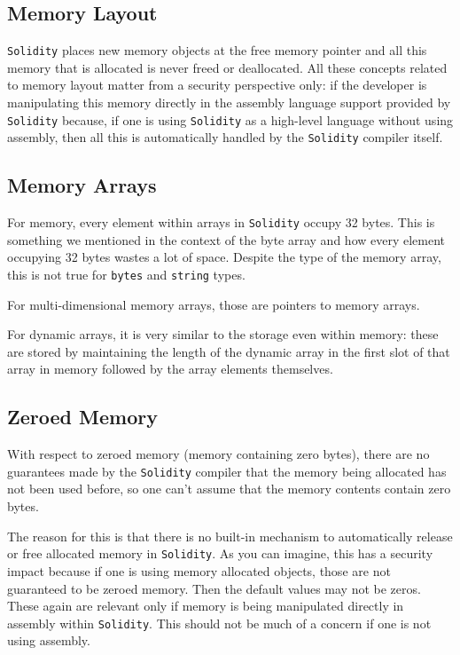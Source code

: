 \subsection{Memory Layout}\label{memory-layout}

\texttt{Solidity} places new memory objects at the free memory pointer
and all this memory that is allocated is never freed or deallocated. All
these concepts related to memory layout matter from a security
perspective only: if the developer is manipulating this memory directly
in the assembly language support provided by \texttt{Solidity} because,
if one is using \texttt{Solidity} as a high-level language without using
assembly, then all this is automatically handled by the
\texttt{Solidity} compiler itself.

\subsection{Memory Arrays}\label{memory-arrays}

For memory, every element within arrays in \texttt{Solidity} occupy 32
bytes. This is something we mentioned in the context of the byte array
and how every element occupying 32 bytes wastes a lot of space. Despite
the type of the memory array, this is not true for \texttt{bytes} and
\texttt{string} types.

For multi-dimensional memory arrays, those are pointers to memory
arrays.

For dynamic arrays, it is very similar to the storage even within
memory: these are stored by maintaining the length of the dynamic array
in the first slot of that array in memory followed by the array elements
themselves.

\subsection{Zeroed Memory}\label{zeroed-memory}

With respect to zeroed memory (memory containing zero bytes), there are
no guarantees made by the \texttt{Solidity} compiler that the memory
being allocated has not been used before, so one can't assume that the
memory contents contain zero bytes.

The reason for this is that there is no built-in mechanism to
automatically release or free allocated memory in \texttt{Solidity}. As
you can imagine, this has a security impact because if one is using
memory allocated objects, those are not guaranteed to be zeroed memory.
Then the default values may not be zeros. These again are relevant only
if memory is being manipulated directly in assembly within
\texttt{Solidity}. This should not be much of a concern if one is not
using assembly.
